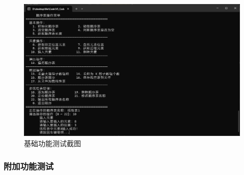 \documentclass[supercite]{Experimental_Report}
\theoremstyle{definition}
\begin{document}
\begin{figure}[htb]
	\begin{center}
		\includegraphics[scale=0.30]{images/1-2.jpg}
		\caption{基础功能测试截图}
		\label{fig1-2}
	\end{center}
\end{figure}

\subsubsection{附加功能测试}
\end{document}
